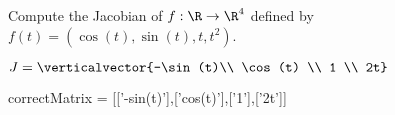 \documentclass{ximera}
\begin{document}
	\begin{question}	
		Compute the Jacobian of $f:\R \to \R^4$ defined by $f(t) = (\cos(t),\sin(t),t,t^2)$.
		\begin{solution}
		\begin{hint}
			\(J = \verticalvector{-\sin(t)\\ \cos(t) \\ 1 \\ 2t}\)
		\end{hint}
		\begin{matrix-answer}[name=J]
			correctMatrix  = [['-sin(t)'],['cos(t)'],['1'],['2t']]
		\end{matrix-answer}
		\end{solution}
	\end{question}
\end{document}
